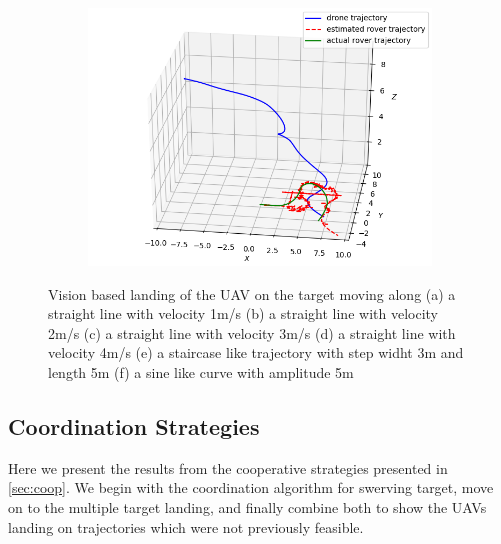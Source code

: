 \documentclass[conf]{new-aiaa}
\begin{document}
\begin{figure}[H]
  \begin{subfigure}{0.5\textwidth}
    \includegraphics[width=\linewidth]{oscillate_vision.png}
    \caption{} \label{fig:oscillate_vision}
  \end{subfigure}%
  \hspace*{\fill}   %
\caption{Vision based landing of the UAV on the target moving along (a) a straight line with velocity 1m/s (b) a straight line with velocity 2m/s (c) a straight line with velocity 3m/s (d) a straight line with velocity 4m/s (e) a staircase like trajectory with step widht 3m and length 5m (f) a sine like curve with amplitude 5m} \label{fig:vision_land}
\end{figure}

\newpage
\subsection{Coordination Strategies}
Here we present the results from the cooperative strategies presented in \ref{sec:coop}. We begin with the coordination algorithm for swerving target, move on to the multiple target landing, and finally combine both to show the UAVs landing on trajectories which were not previously feasible.
\end{document}
